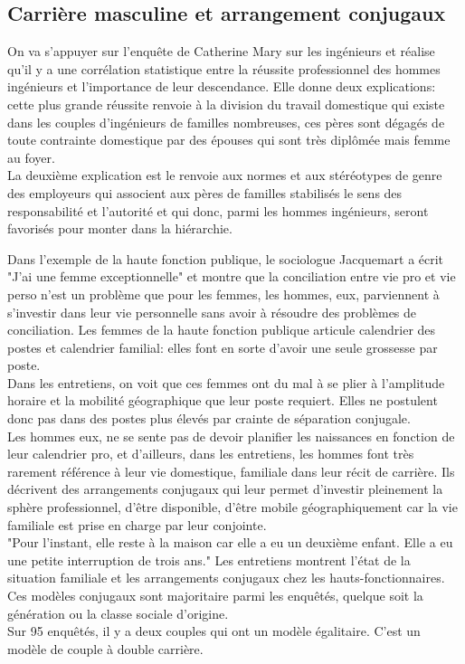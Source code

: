 \documentclass[12pt, a4paper, openany]{book}
\begin{document}
\subsection{Carrière masculine et arrangement conjugaux}

On va s'appuyer sur l'enquête de Catherine Mary sur les ingénieurs et réalise qu'il y a une corrélation statistique entre la réussite professionnel des hommes ingénieurs et l'importance de leur descendance. Elle donne deux explications: cette plus grande réussite renvoie à la division du travail domestique qui existe dans les couples d'ingénieurs de familles nombreuses, ces pères sont dégagés de toute contrainte domestique par des épouses qui sont très diplômée mais femme au foyer. \\
La deuxième explication est le renvoie aux normes et aux stéréotypes de genre des employeurs qui associent aux pères de familles stabilisés le sens des responsabilité et l'autorité et qui donc, parmi les hommes ingénieurs, seront favorisés pour monter dans la hiérarchie.


Dans l'exemple de la haute fonction publique, le sociologue Jacquemart a écrit "J'ai une femme exceptionnelle" et montre que la conciliation entre vie pro et vie perso n'est un problème que pour les femmes, les hommes, eux, parviennent à s'investir dans leur vie personnelle sans avoir à résoudre des problèmes de conciliation. Les femmes de la haute fonction publique articule calendrier des postes et calendrier familial: elles font en sorte d'avoir une seule grossesse par poste. \\
Dans les entretiens, on voit que ces femmes ont du mal à se plier à l'amplitude horaire et la mobilité géographique que leur poste requiert. Elles ne postulent donc pas dans des postes plus élevés par crainte de séparation conjugale. \\
Les hommes eux, ne se sente pas de devoir planifier les naissances en fonction de leur calendrier pro, et d'ailleurs, dans les entretiens, les hommes font très rarement référence à leur vie domestique, familiale dans leur récit de carrière. Ils décrivent des arrangements conjugaux qui leur permet d'investir pleinement la sphère professionnel, d'être disponible, d'être mobile géographiquement car la vie familiale est prise en charge par leur conjointe. \\
"Pour l'instant, elle reste à la maison car elle a eu un deuxième enfant. Elle a eu une petite interruption de trois ans." Les entretiens montrent l'état de la situation familiale et les arrangements conjugaux chez les hauts-fonctionnaires. Ces modèles conjugaux sont majoritaire parmi les enquêtés, quelque soit la génération ou la classe sociale d'origine. \\
Sur 95 enquêtés, il y a deux couples qui ont un modèle égalitaire. C'est un modèle de couple à double carrière. 
\end{document}
